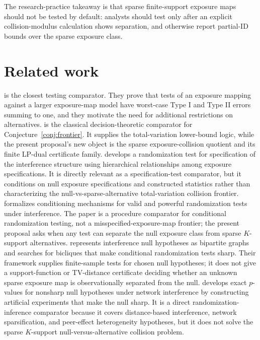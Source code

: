 \documentclass[11pt]{article}
\theoremstyle{definition}
\theoremstyle{plain}
\theoremstyle{remark}
\begin{document}
The research-practice takeaway is that sparse finite-support exposure maps should not be tested by default: analysts should test only after an explicit collision-modulus calculation shows separation, and otherwise report partial-ID bounds over the sparse exposure class.

\section{Related work}
\citet{GaoHarshawSavjeWang2026} is the closest testing comparator.  They prove that tests of an exposure mapping against a larger exposure-map model have worst-case Type I and Type II errors summing to one, and they motivate the need for additional restrictions on alternatives.
\citet[Chapter~6]{LeCam1986} is the classical decision-theoretic comparator for Conjecture~\ref{conj:frontier}.  It supplies the total-variation lower-bound logic, while the present proposal's new object is the sparse exposure-collision quotient and its finite LP-dual certificate family.
\citet[Sections~2--3]{HoshinoYanagi2023} develops a randomization test for specification of the interference structure using hierarchical relationships among exposure specifications.  It is directly relevant as a specification-test comparator, but it conditions on null exposure specifications and constructed statistics rather than characterizing the null-vs-sparse-alternative total-variation collision frontier.
\citet[Sections~2--3]{BasseFellerToulis2019} formalizes conditioning mechanisms for valid and powerful randomization tests under interference.  The paper is a procedure comparator for conditional randomization testing, not a misspecified-exposure-map frontier; the present proposal asks when any test can separate the null exposure class from sparse \(K\)-support alternatives.
\citet[Sections~2--4]{PuelzBasseFellerToulis2022} represents interference null hypotheses as bipartite graphs and searches for bicliques that make conditional randomization tests sharp.  Their framework supplies finite-sample tests for chosen null hypotheses; it does not give a support-function or TV-distance certificate deciding whether an unknown sparse exposure map is observationally separated from the null.
\citet[Sections~2--4]{AtheyEcklesImbens2018} develops exact \(p\)-values for nonsharp null hypotheses under network interference by constructing artificial experiments that make the null sharp.  It is a direct randomization-inference comparator because it covers distance-based interference, network sparsification, and peer-effect heterogeneity hypotheses, but it does not solve the sparse \(K\)-support null-versus-alternative collision problem.
\end{document}
